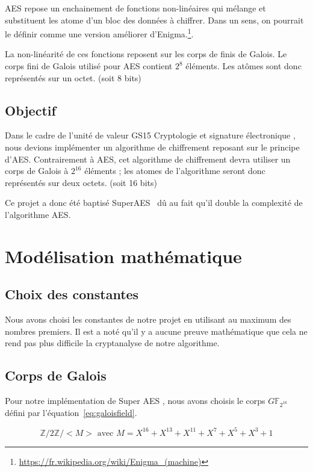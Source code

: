 \documentclass[12pt,a4paper]{report}
\begin{document}
AES repose un enchainement de fonctions non-linéaires qui mélange et substituent les
atome d'un bloc des données à chiffrer. Dans un sens, on pourrait le définir comme une
version améliorer d'Enigma.\footnote{\url{https://fr.wikipedia.org/wiki/Enigma_(machine)}}.

La non-linéarité de ces fonctions reposent sur les corps de finis de Galois. Le
corps fini de Galois utilisé pour AES contient $2^{8}$ éléments. Les atômes
sont donc représentés sur un octet. (soit 8 bits)

\section{Objectif}

Dans le cadre de l'unité de valeur GS15 \og Cryptologie et signature
électronique \fg, nous devions implémenter un algorithme de chiffrement
reposant sur le principe d'AES. Contrairement à AES, cet algorithme de
chiffrement devra utiliser un corps de Galois à $2^{16}$ éléments ; les atomes
de l'algorithme seront donc représentés sur deux octets. (soit 16 bits)

Ce projet a donc été baptisé \og SuperAES \fg\ dû au fait qu'il double la complexité
de l'algorithme AES.


\chapter{Modélisation mathématique}

\section{Choix des constantes}

Nous avons choisi les constantes de notre projet en utilisant au maximum des
nombres premiers. Il est a noté qu'il y a aucune preuve mathématique que
cela ne rend pas plus difficile la cryptanalyse de notre algorithme.

\section{Corps de Galois}

Pour notre implémentation de \og Super AES \fg, nous avons choisis le corps
$G\mathbb{F}_{2^{16}}$ défini par l'équation~\ref{eq:galoisfield}.

\begin{equation}
\label{eq:galoisfield}
\mathbb{Z}/2\mathbb{Z}/<M> \mbox{ avec } M = X^{16} + X^{13} + X^{11} + X^{7} + X^{5} + X^{3} + 1
\end{equation}
\end{document}
